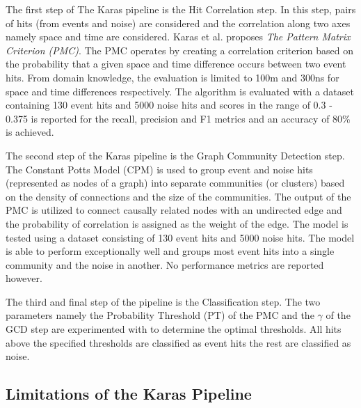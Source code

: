 The first step of The Karas pipeline is the Hit Correlation step. In
this step, pairs of hits (from events and noise) are considered and
the correlation along two axes namely space and time are considered.
Karas et al. proposes \textit{The Pattern Matrix Criterion (PMC)}. The
PMC operates by creating a correlation criterion based on the
probability that a given space and time difference occurs between two
event hits. From domain knowledge, the evaluation is limited to 100m
and 300ns for space and time differences respectively. The algorithm
is evaluated with a dataset containing 130 event hits and 5000 noise
hits and scores in the range of 0.3 - 0.375 is reported for the
recall, precision and F1 metrics and an accuracy of 80\% is achieved.

The second step of the Karas pipeline is the Graph Community Detection
step. The Constant Potts Model (CPM) is used to group event and noise hits
(represented as nodes of a graph) into separate communities (or clusters)
based on the density of connections and the size of the communities. The
output of the PMC is utilized to connect causally related nodes with an
undirected edge and the probability of correlation is assigned as the weight
of the edge. The model is tested using a dataset consisting of 130 event hits
and 5000 noise hits. The model is able to perform exceptionally well and
groups most event hits into a single community and the noise in another. No
performance metrics are reported however.

The third and final step of the pipeline is the Classification step. The two
parameters namely the Probability Threshold (PT) of the PMC and the $\gamma$
of the GCD step are experimented with to determine the optimal thresholds. All
hits above the specified thresholds are classified as event hits the rest are
classified as noise.

\subsection{Limitations of the Karas Pipeline}
\label{sec:karas-pipeline-limitations}



